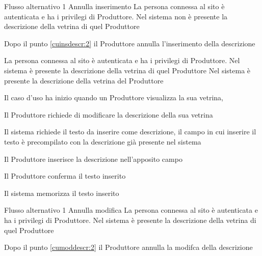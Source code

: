 %
{Flusso alternativo 1}%
{Annulla inserimento}%
{La persona connessa al sito è autenticata e ha i privilegi di Produttore. Nel sistema non è presente la descrizione della vetrina di quel Produttore}%
{\postNulle}%
{\begin{enumCU}
		\item Dopo il punto \ref{cuinsdescr:2} il Produttore annulla l'inserimento della descrizione
	\end{enumCU}}%


{}
{La persona connessa al sito è autenticata e ha i privilegi di Produttore. Nel sistema è presente la descrizione della vetrina di quel Produttore}
{Nel sistema è presente la descrizione della vetrina del Produttore}
{\begin{enumCU}
		\item Il caso d'uso ha inizio quando un Produttore visualizza la sua vetrina, 
		\item Il Produttore richiede di modificare la descrizione della sua vetrina
		\item Il sistema richiede il testo da inserire come descrizione, il campo in cui inserire il testo è precompilato con la descrizione già presente nel sistema 
		\item Il Produttore inserisce la descrizione nell'apposito campo\label{cumoddescr:2}
		\item Il Produttore conferma il testo inserito
		\item Il sistema memorizza il testo inserito
	\end{enumCU}}
%
{Flusso alternativo 1}%
{Annulla modifica}%
{La persona connessa al sito è autenticata e ha i privilegi di Produttore. Nel sistema è presente la descrizione della vetrina di quel Produttore}%
{\postNulle}%
{\begin{enumCU}
		\item Dopo il punto \ref{cumoddescr:2} il Produttore annulla la modifca della descrizione
	\end{enumCU}}%


